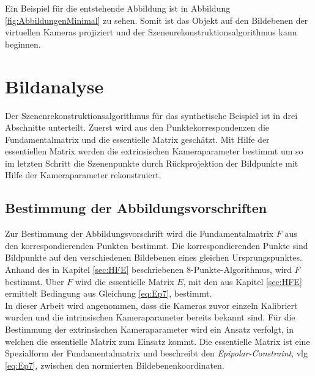 %

 Ein Beispiel für die entstehende Abbildung ist in Abbildung \ref{fig:AbbildungenMinimal} zu sehen. Somit ist das Objekt auf den Bildebenen der virtuellen Kameras projiziert und der Szenenrekonstruktionsalgorithmus kann beginnen.



\section{Bildanalyse}
\label{sec:MinimalFun}

Der Szenenrekonstruktionsalgorithmus für das synthetische Beispiel ist in drei Abschnitte unterteilt. Zuerst wird aus den Punktekorrespondenzen die Fundamentalmatrix und die essentielle Matrix geschätzt. Mit Hilfe der essentiellen Matrix werden die extrinsischen Kameraparameter bestimmt um so im letzten Schritt die Szenenpunkte durch Rückprojektion der Bildpunkte mit Hilfe der Kameraparameter rekonstruiert. 

\subsection{Bestimmung der Abbildungsvorschriften}

Zur Bestimmung der Abbildungsvorschrift wird die Fundamentalmatrix $F$ aus den korrespondierenden Punkten bestimmt. Die korrespondierenden Punkte sind Bildpunkte auf den verschiedenen Bildebenen eines gleichen Ursprungspunktes. Anhand des in Kapitel \ref{sec:HFE} beschriebenen 8-Punkte-Algorithmus, wird $F$ bestimmt. Über $F$ wird die essentielle Matrix $E$, mit den aus Kapitel \ref{sec:HFE} ermittelt Bedingung aus Gleichung \ref{eq:Ep7}, bestimmt.\\

In dieser Arbeit wird angenommen, dass die Kameras zuvor einzeln Kalibriert wurden und die intrinsischen Kameraparameter bereits bekannt sind. Für die Bestimmung der extrinsischen Kameraparameter wird ein Ansatz verfolgt, in welchen die essentielle Matrix zum Einsatz kommt. Die essentielle Matrix ist eine Spezialform der Fundamentalmatrix und beschreibt den \textit{Epipolar-Constraint}, vlg \ref{eq:Ep7}, zwischen den normierten Bildebenenkoordinaten\cite{HZ,Elements,ZZGXr,Zhang2014,Ferid}. 

